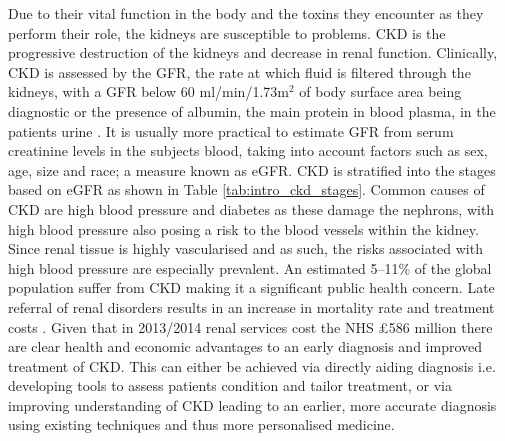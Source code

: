 Due to their vital function in the body and the toxins they encounter as they perform their role, the kidneys are susceptible to problems. \ac{CKD} is the progressive destruction of the kidneys and decrease in renal function. Clinically, \ac{CKD} is assessed by the \ac{GFR}, the rate at which fluid is filtered through the kidneys, with a \ac{GFR} below 60 ml/min/1.73m$^2$ of body surface area being diagnostic or the presence of albumin, the main protein in blood plasma, in the patients urine \cite{stevens_assessing_2006, farrugia_albumin_2010, pruijm_blood_2017}. It is usually more practical to estimate \ac{GFR} from serum creatinine levels in the subjects blood, taking into account factors such as sex, age, size and race; a measure known as \ac{eGFR}. \ac{CKD} is stratified into the stages based on \ac{eGFR} as shown in Table \ref{tab:intro_ckd_stages}. Common causes of \ac{CKD} are high blood pressure and diabetes as these damage the nephrons, with high blood pressure also posing a risk to the blood vessels within the kidney. Since renal tissue is highly vascularised and as such, the risks associated with high blood pressure are especially prevalent. An estimated 5–11\% of the global population suffer from \ac{CKD} \cite{coresh_prevalence_2003, de_lusignan_identifying_2005, drey_population-based_2003, amato_prevalence_2005, chadban_prevalence_2003} making it a significant public health concern. Late referral of renal disorders results in an increase in mortality rate and treatment costs \cite{jungers_late_1993, sesso_late_1996, klebe_cost_2007}. Given that in 2013/2014 renal services cost the \ac{NHS} \pounds 586 million \cite{precious_nhs_2015} there are clear health and economic advantages to an early diagnosis and improved treatment of \ac{CKD}. This can either be achieved via directly aiding diagnosis i.e. developing tools to assess patients condition and tailor treatment, or via improving understanding of \ac{CKD} leading to an earlier, more accurate diagnosis using existing techniques and thus more personalised medicine.

